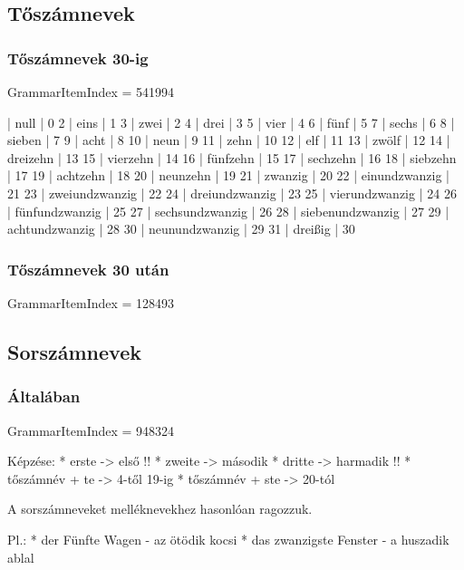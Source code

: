 \documentclass{article}
\newenvironment{desc}{\verbatim}{\endverbatim}
\newenvironment{exmp}{\verbatim}{\endverbatim}
\begin{document}
\subsection{Tőszámnevek}

\subsubsection{Tőszámnevek 30-ig}

GrammarItemIndex = 541994

\begin{desc}
\end{desc}

\begin{exmp}
1 | null | 0
2 | eins | 1
3 | zwei | 2
4 | drei | 3
5 | vier | 4
6 | fünf | 5
7 | sechs | 6
8 | sieben | 7
9 | acht | 8
10 | neun | 9
11 | zehn | 10
12 | elf | 11
13 | zwölf | 12
14 | dreizehn | 13
15 | vierzehn | 14
16 | fünfzehn | 15
17 | sechzehn | 16
18 | siebzehn | 17
19 | achtzehn | 18
20 | neunzehn | 19
21 | zwanzig | 20
22 | einundzwanzig | 21
23 | zweiundzwanzig | 22
24 | dreiundzwanzig | 23
25 | vierundzwanzig | 24
26 | fünfundzwanzig | 25
27 | sechsundzwanzig | 26
28 | siebenundzwanzig | 27
29 | achtundzwanzig | 28
30 | neunundzwanzig | 29
31 | dreißig | 30
\end{exmp}

\subsubsection{Tőszámnevek 30 után}

GrammarItemIndex = 128493

\begin{desc}
\end{desc}

\begin{exmp}
\end{exmp}

\subsection{Sorszámnevek}

\subsubsection{Általában}

GrammarItemIndex = 948324

\begin{desc}
Képzése: * erste -> első !!
* zweite -> második
* dritte -> harmadik !!
* tőszámnév + te -> 4-től 19-ig
* tőszámnév + ste -> 20-tól

A sorszámneveket melléknevekhez hasonlóan ragozzuk.

Pl.: * der Fünfte Wagen - az ötödik kocsi
* das zwanzigste Fenster - a huszadik ablal
\end{desc}
\end{document}

